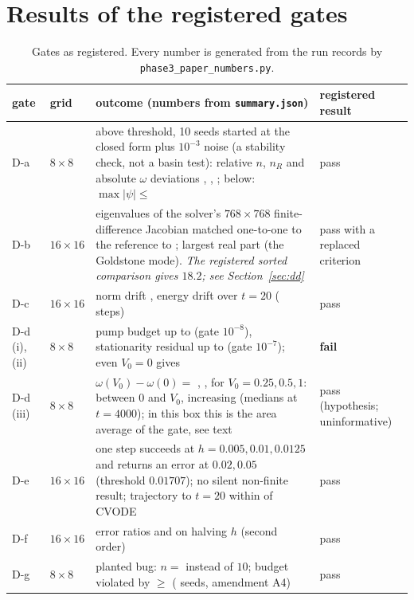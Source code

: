 \section{Results of the registered gates}\label{sec:results}

\begin{table}[ht]
\centering\small
\begin{tabular}{@{}p{}p{}p{}p{}@{}}
\toprule
gate & grid & outcome (numbers from \texttt{summary.json}) & registered result \\ \midrule
D-a & $8\times8$ & above threshold, 10 seeds started at the closed form plus $10^{-3}$ noise (a stability check, not a basin test): relative $n$, $n_R$ and absolute $\omega$ deviations \DaWorstN{}, \DaWorstNR{}, \DaWorstOm{}; below: $\max|\psi|\le$ \DaBelowPsi{} & pass \\
D-b & $16\times16$ & eigenvalues of the solver's $768\times768$ finite-difference Jacobian matched one-to-one to the reference to \DbMatch{}; largest real part \DbMaxRe{} (the Goldstone mode). \emph{The registered sorted comparison gives $18.2$; see Section~\ref{sec:dd}} & pass with a replaced criterion \\
D-c & $16\times16$ & norm drift \DcNorm{}, energy drift \DcEnergy{} over $t=20$ (\DcSteps{} steps) & pass \\
D-d (i),(ii) & $8\times8$ & pump budget up to \DdBudgetMax{} (gate $10^{-8}$), stationarity residual up to \DdResidMax{} (gate $10^{-7}$); even $V_0=0$ gives \DdResidZero{} & \textbf{fail} \\
D-d (iii) & $8\times8$ & $\omega(V_0)-\omega(0)=$ \DdShiftA{}, \DdShiftB{}, \DdShiftC{} for $V_0=0.25,0.5,1$: between $0$ and $V_0$, increasing (medians at $t=4000$); in this box this is the area average of the gate, see text & pass (hypothesis; uninformative) \\
D-e & $16\times16$ & one step succeeds at $h=0.005,0.01,0.0125$ and returns an error at $0.02,0.05$ (threshold $0.01707$); no silent non-finite result; trajectory to $t=20$ within \DeTraj{} of CVODE & pass \\
D-f & $16\times16$ & error ratios \DfRatioA{} and \DfRatioB{} on halving $h$ (second order) & pass \\
D-g & $8\times8$ & planted bug: $n=$ \DgN{} instead of $10$; budget violated by $\ge$\DgBudget{} (\DgSeeds{} seeds, amendment A4) & pass \\
\bottomrule
\end{tabular}
\caption{Gates as registered. Every number is generated from the run records by \texttt{phase3\_paper\_numbers.py}.}
\end{table}

